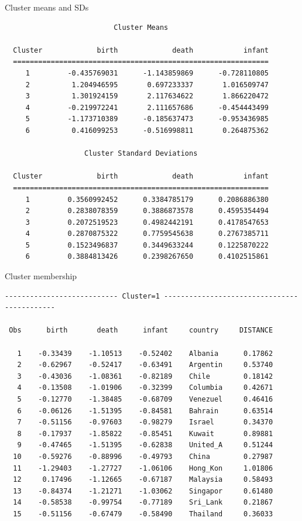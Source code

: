 \documentclass[pdf]{prosper}
\begin{document}
\begin{slide}{Cluster means and SDs}

{\scriptsize
\begin{verbatim}
                          Cluster Means

  Cluster             birth             death            infant
  =============================================================
     1         -0.435769031      -1.143859869      -0.728110805
     2          1.204946595       0.697233337       1.016509747
     3          1.301924159       2.117634622       1.866220472
     4         -0.219972241       2.111657686      -0.454443499
     5         -1.173710389      -0.185637473      -0.953436985
     6          0.416099253      -0.516998811       0.264875362

                   Cluster Standard Deviations

  Cluster             birth             death            infant
  =============================================================
     1         0.3560992452      0.3384785179      0.2086886380
     2         0.2838078359      0.3886873578      0.4595354494
     3         0.2072519523      0.4982442191      0.4178547653
     4         0.2870875322      0.7759545638      0.2767385711
     5         0.1523496837      0.3449633244      0.1225870222
     6         0.3884813426      0.2398267650      0.4102515861
\end{verbatim}
}


\end{slide}

\begin{slide}{Cluster membership}

{\scriptsize
\begin{verbatim}
--------------------------- Cluster=1 --------------------------------------------

 Obs      birth       death      infant     country     DISTANCE

   1    -0.33439    -1.10513    -0.52402    Albania      0.17862
   2    -0.62967    -0.52417    -0.63491    Argentin     0.53740
   3    -0.43036    -1.08361    -0.82189    Chile        0.18142
   4    -0.13508    -1.01906    -0.32399    Columbia     0.42671
   5    -0.12770    -1.38485    -0.68709    Venezuel     0.46416
   6    -0.06126    -1.51395    -0.84581    Bahrain      0.63514
   7    -0.51156    -0.97603    -0.98279    Israel       0.34370
   8    -0.17937    -1.85822    -0.85451    Kuwait       0.89881
   9    -0.47465    -1.51395    -0.62838    United_A     0.51244
  10    -0.59276    -0.88996    -0.49793    China        0.27987
  11    -1.29403    -1.27727    -1.06106    Hong_Kon     1.01806
  12     0.17496    -1.12665    -0.67187    Malaysia     0.58493
  13    -0.84374    -1.21271    -1.03062    Singapor     0.61480
  14    -0.58538    -0.99754    -0.77189    Sri_Lank     0.21867
  15    -0.51156    -0.67479    -0.58490    Thailand     0.36033
\end{verbatim}
}

\end{slide}
\end{document}
